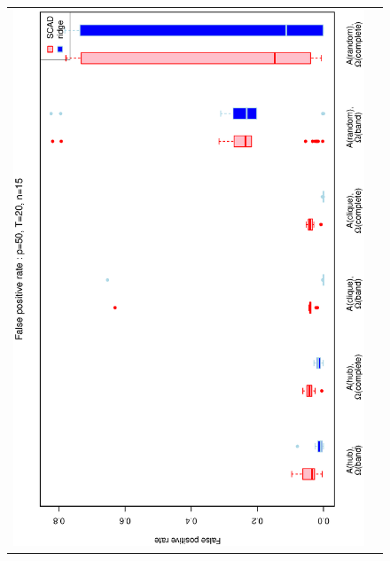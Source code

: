\documentclass[a4paper]{article}
\begin{document}
\begin{figure}[h!]
\centering
\begin{tabular}{cc}
\includegraphics[scale=0.45,angle=270]{ROCfpr50T20N15_25.eps}
\\

\end{tabular}
\end{figure}
\end{document}
